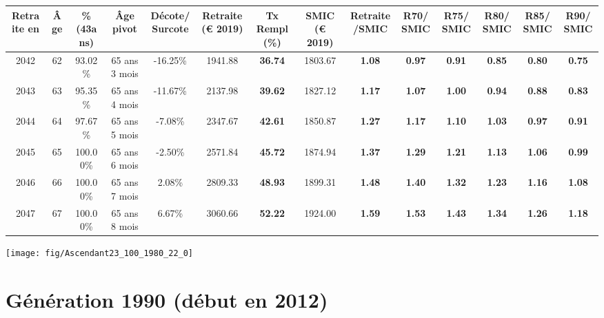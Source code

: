 \begin{adjustbox}{max width=\textwidth} 
\begin{tabular}[htb]{|c|c||c|c|c||c|c||c|c||c|c|c|c|c|} 
\hline 
 Retraite en &  Âge &  \%(43ans) &  Âge pivot &  Décote/Surcote &  Retraite (\euro{} 2019) &  Tx Rempl(\%) &  SMIC (\euro{} 2019) &  Retraite/SMIC &  R70/SMIC &  R75/SMIC &  R80/SMIC &  R85/SMIC &  R90/SMIC \\ 
\hline \hline 
 2042 &  62 &  93.02\% &  65 ans 3 mois &  -16.25\% &  1941.88 &  {\bf 36.74} &  1803.67 &  {\bf 1.08} &  {\bf {\color{red} 0.97}} &  {\bf {\color{red} 0.91}} &  {\bf {\color{red} 0.85}} &  {\bf {\color{red} 0.80}} &  {\bf {\color{red} 0.75}} \\ 
\hline 
 2043 &  63 &  95.35\% &  65 ans 4 mois &  -11.67\% &  2137.98 &  {\bf 39.62} &  1827.12 &  {\bf 1.17} &  {\bf 1.07} &  {\bf 1.00} &  {\bf {\color{red} 0.94}} &  {\bf {\color{red} 0.88}} &  {\bf {\color{red} 0.83}} \\ 
\hline 
 2044 &  64 &  97.67\% &  65 ans 5 mois &  -7.08\% &  2347.67 &  {\bf 42.61} &  1850.87 &  {\bf 1.27} &  {\bf 1.17} &  {\bf 1.10} &  {\bf 1.03} &  {\bf {\color{red} 0.97}} &  {\bf {\color{red} 0.91}} \\ 
\hline 
 2045 &  65 &  100.00\% &  65 ans 6 mois &  -2.50\% &  2571.84 &  {\bf 45.72} &  1874.94 &  {\bf 1.37} &  {\bf 1.29} &  {\bf 1.21} &  {\bf 1.13} &  {\bf 1.06} &  {\bf {\color{red} 0.99}} \\ 
\hline 
 2046 &  66 &  100.00\% &  65 ans 7 mois &  2.08\% &  2809.33 &  {\bf 48.93} &  1899.31 &  {\bf 1.48} &  {\bf 1.40} &  {\bf 1.32} &  {\bf 1.23} &  {\bf 1.16} &  {\bf 1.08} \\ 
\hline 
 2047 &  67 &  100.00\% &  65 ans 8 mois &  6.67\% &  3060.66 &  {\bf 52.22} &  1924.00 &  {\bf 1.59} &  {\bf 1.53} &  {\bf 1.43} &  {\bf 1.34} &  {\bf 1.26} &  {\bf 1.18} \\ 
\hline 
\hline 
\end{tabular} 
\end{adjustbox} 
 
 \vspace{0.1cm} 

 {\hspace{-2.2cm}\texttt{[image: fig/Ascendant23\_100\_1980\_22\_0]}} 

\newpage 
 
\section{Génération 1990 (début en 2012)\label{Ascendant23_100_1990_22_0}} 
 
